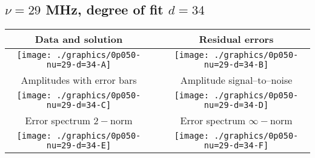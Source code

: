 

% 

\clearpage{}
\break{}

\subsection{$\nu = 29$ MHz, degree of fit $d = 34$}

\begin{table}[h]
    \begin{center}
        \begin{tabular}{ccc}
            Data and solution & \quad & Residual errors \\\hline
            \texttt{[image: ./graphics/0p050-nu=29-d=34-A]} &&
            \texttt{[image: ./graphics/0p050-nu=29-d=34-B]} \\[15pt]
            Amplitudes with error bars && Amplitude signal--to--noise \\\hline
            \texttt{[image: ./graphics/0p050-nu=29-d=34-C]} &&
            \texttt{[image: ./graphics/0p050-nu=29-d=34-D]} \\[15pt]
            Error spectrum $2-$norm && Error spectrum $\infty-$norm \\\hline
            \texttt{[image: ./graphics/0p050-nu=29-d=34-E]} &&
            \texttt{[image: ./graphics/0p050-nu=29-d=34-F]} \\[15pt]
        \end{tabular}
    \end{center}
\label{fig:elev=50, nu=29}
\end{table}



\endinput
